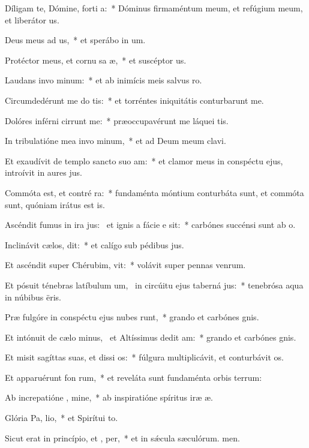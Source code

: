 \item Díligam te, Dómine, forti a:~* Dóminus firmaméntum meum, et refúgium meum, et liberátor us.
\item Deus meus ad us,~* et sperábo in um.
\item Protéctor meus, et cornu sa æ,~* et suscéptor us.
\item Laudans invo minum:~* et ab inimícis meis salvus ro.
\item Circumdedérunt me do tis:~* et torréntes iniquitátis conturbarunt me.
\item Dolóres inférni cirrunt me:~* præoccupavérunt me láquei tis.
\item In tribulatióne mea invo minum,~* et ad Deum meum clavi.
\item Et exaudívit de templo sancto suo  am:~* et clamor meus in conspéctu ejus, introívit in aures jus.
\item Commóta est, et contré ra:~* fundaménta móntium conturbáta sunt, et commóta sunt, quóniam irátus est is.
\item Ascéndit fumus in ira jus:~\pscross{} et ignis a fácie e sit:~* carbónes succénsi sunt ab o.
\item Inclinávit cælos,  dit:~* et calígo sub pédibus jus.
\item Et ascéndit super Chérubim,  vit:~* volávit super pennas venrum.
\item Et pósuit ténebras latíbulum um,~\pscross{} in circúitu ejus taberná jus:~* tenebrósa aqua in núbibus ëris.
\item Præ fulgóre in conspéctu ejus nubes runt,~* grando et carbónes gnis.
\item Et intónuit de cælo minus,~\pscross{} et Altíssimus dedit  am:~* grando et carbónes gnis.
\item Et misit sagíttas suas, et dissi os:~* fúlgura multiplicávit, et conturbávit os.
\item Et apparuérunt fon rum,~* et reveláta sunt fundaménta orbis terrum:
\item Ab increpatióne , mine,~* ab inspiratióne spíritus iræ æ.
\item Glória Pa,  lio,~* et Spirítui to.
\item Sicut erat in princípio, et ,  per,~* et in sǽcula sæculórum. men.
